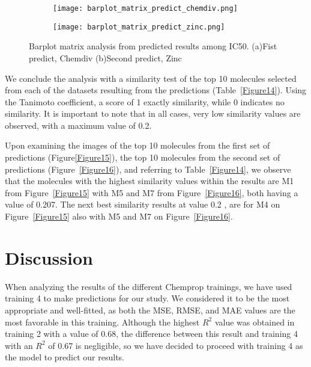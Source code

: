 \documentclass[final,times,twocolumn,article]{elsarticle}
\begin{document}
 \begin{figure*}[h]
    \centering
    \begin{subfigure}{0.9\textwidth}
        \texttt{[image: barplot\_matrix\_predict\_chemdiv.png]} 
        \caption{}
    \end{subfigure}
    \begin{subfigure}{0.9\textwidth}
        \texttt{[image: barplot\_matrix\_predict\_zinc.png]}
        \caption{}
    \end{subfigure}
    
    \caption{Barplot matrix analysis from predicted results among IC50. (a)Fist predict, Chemdiv (b)Second predict, Zinc }
    \label{Figure17}
\end{figure*}


 We conclude the analysis with a similarity test of the top 10 molecules selected from each of the datasets resulting from the predictions (Table~\ref{Figure14}). Using the Tanimoto coefficient, a score of 1 exactly similarity, while 0 indicates no similarity. It is important to note that in all cases, very low similarity values are observed, with a maximum value of 0.2.

 Upon examining the images of the top 10 molecules from the first set of predictions (Figure{\ref{Figure15}}), the top 10 molecules from the second set of predictions (Figure~\ref{Figure16}), and referring to Table~\ref{Figure14}, we observe that the molecules with the highest similarity values within the results are M1 from Figure~\ref{Figure15} with M5 and M7 from Figure~\ref{Figure16}, both having a value of 0.207. The next best similarity results at value 0.2 , are for M4 on Figure~\ref{Figure15} also with M5 and M7 on Figure~\ref{Figure16}. 
 

\section{Discussion}

When analyzing the results of the different Chemprop trainings, we have used training 4 to make predictions for our study. We considered it to be the most appropriate and well-fitted, as both the MSE, RMSE, and MAE values are the most favorable in this training. Although the highest $R^2$ value was obtained in training 2 with a value of 0.68, the difference between this result and training 4 with an $R^2$ of 0.67 is negligible, so we have decided to proceed with training 4 as the model to predict our results.
\end{document}
